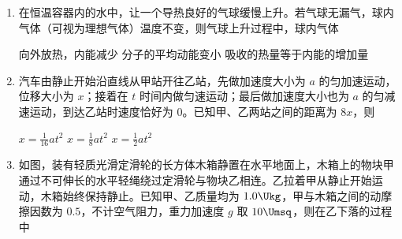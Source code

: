 \documentclass[\gkver]{gaokaozhenti}
\begin{document}
\begin{enumerate}
{故选 D。
}

\item
在恒温容器内的水中，让一个导热良好的气球缓慢上升。若气球无漏气，球内气体（可视为理想气体）温度不变，则气球上升过程中，球内气体

{向外放热，内能减少}
{分子的平均动能变小}
{吸收的热量等于内能的增加量}


\item
汽车由静止开始沿直线从甲站开往乙站，先做加速度大小为 $a$ 的匀加速运动，位移大小为 $x$；接着在 $t$ 时间内做匀速运动；最后做加速度大小也为 $a$ 的匀减速运动，到达乙站时速度恰好为 0。已知甲、乙两站之间的距离为 $8x$，则

{$x = \frac{1}{16}at^{2}$}
{$x = \frac{1}{8}at^{2}$}
{$x = \frac{1}{2}at^{2}$}


\item
如图，装有轻质光滑定滑轮的长方体木箱静置在水平地面上，木箱上的物块甲通过不可伸长的水平轻绳绕过定滑轮与物块乙相连。乙拉着甲从静止开始运动，木箱始终保持静止。已知甲、乙质量均为 $1.0 \Ukg$，甲与木箱之间的动摩擦因数为 $0.5$，不计空气阻力，重力加速度 $g$ 取 $10 \Umsq$，则在乙下落的过程中


\end{enumerate}
\end{document}
